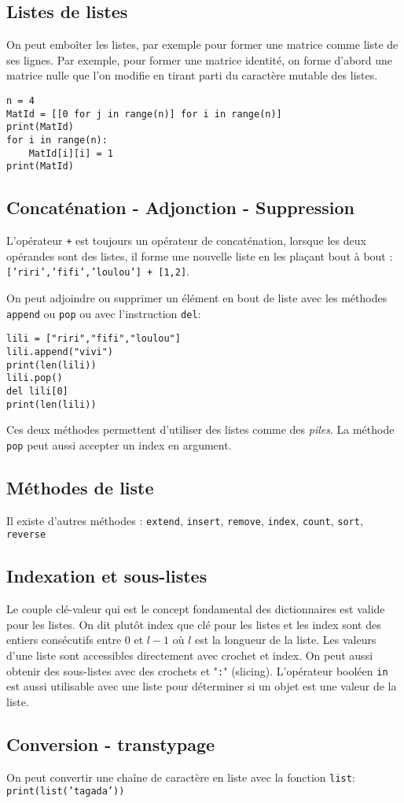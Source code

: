 \subsection{Listes de listes}
On peut emboîter les listes, par exemple pour former une matrice comme liste de ses lignes.\newline
Par exemple, pour former une matrice identité, on forme d'abord une matrice nulle que l'on modifie en tirant parti du caractère mutable des listes.
\begin{verbatim}
n = 4
MatId = [[0 for j in range(n)] for i in range(n)]
print(MatId)
for i in range(n):
    MatId[i][i] = 1
print(MatId)\end{verbatim}

\subsection{Concaténation - Adjonction - Suppression}
L'opérateur \texttt{+} est toujours un opérateur de concaténation, lorsque les deux opérandes sont des listes, il forme une nouvelle liste en les plaçant bout à bout : \newline\texttt{['riri','fifi','loulou'] + [1,2]}.

On peut adjoindre ou supprimer un élément en bout de liste avec les méthodes \texttt{append} ou \texttt{pop} ou avec l'instruction \texttt{del}:
\begin{verbatim}
lili = ["riri","fifi","loulou"]
lili.append("vivi")
print(len(lili))
lili.pop()
del lili[0]
print(len(lili))\end{verbatim}
Ces deux méthodes permettent d'utiliser des listes comme des \emph{piles}. La méthode \texttt{pop} peut aussi accepter un index en argument.

\subsection{Méthodes de liste}
Il existe d'autres méthodes : \texttt{extend}, \texttt{insert}, \texttt{remove}, \texttt{index}, \texttt{count}, \texttt{sort}, \texttt{reverse}

\subsection{Indexation et sous-listes}
Le couple clé-valeur qui est le concept fondamental des dictionnaires est valide pour les listes. On dit plutôt index que clé pour les listes et les index sont des entiers consécutifs entre $0$ et $l-1$ où $l$ est la longueur de la liste. 
Les valeurs d'une liste sont accessibles directement avec crochet et index. On peut aussi obtenir des sous-listes avec des crochets et "\texttt{:}" (slicing).\newline
L'opérateur booléen \texttt{in} est aussi utilisable avec une liste pour déterminer si un objet est une valeur de la liste.

\subsection{Conversion - transtypage}
On peut convertir une chaîne de caractère en liste avec la fonction \texttt{list}:\newline
\texttt{print(list('tagada'))}

